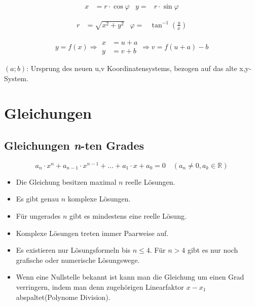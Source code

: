
\begin{shaded}
 \begin{align}
  x&=r\cdot \cos \varphi& y=&r\cdot\sin\varphi
 \end{align}
\end{shaded}



\begin{shaded}
 \begin{align}
  r&=\sqrt{x^2+y^2}& \varphi=&\tan^{-1}\left(\frac{y}{x}\right)
 \end{align}
\end{shaded}


\begin{shaded}
 \begin{equation}
    y=f(x)\Rightarrow\left.\begin{aligned}
                            x&=u+a\\
			    y&=v+b
                           \end{aligned}\right.\Rightarrow v=f(u+a)-b
 \end{equation}
\end{shaded}
$(a;b)$: Ursprung des neuen u,v Koordinatensystems, bezogen auf das alte x,y-System. 

\section{Gleichungen}
\subsection{Gleichungen \emph{n}-ten Grades}
\begin{shaded}
 \begin{equation}
  a_n\cdot x^n+a_{n-1}\cdot x^{n-1}+\ldots+a_1\cdot x+a_0=0\quad (a_n\neq0,a_k\in\mathbb{R})
 \end{equation}

\end{shaded}
\begin{itemize}
 \item Die Gleichung besitzen maximal $n$ reelle Lösungen.
\item Es gibt genau $n$ komplexe Lösungen.
\item Für ungerades $n$ gibt es mindestens eine reelle Lösung.
\item Komplexe Lösungen treten immer Paarweise auf.
\item Es existieren nur Lösungsformeln bis $n\leq 4$. Für $n>4$ gibt es nur noch grafische oder numerische Lösungswege.
\item Wenn eine Nullstelle bekannt ist kann man die Gleichung um einen Grad verringern, indem man denn zugehörigen Linearfaktor $x -x_1$ abspaltet(Polynome Division).
\end{itemize}

